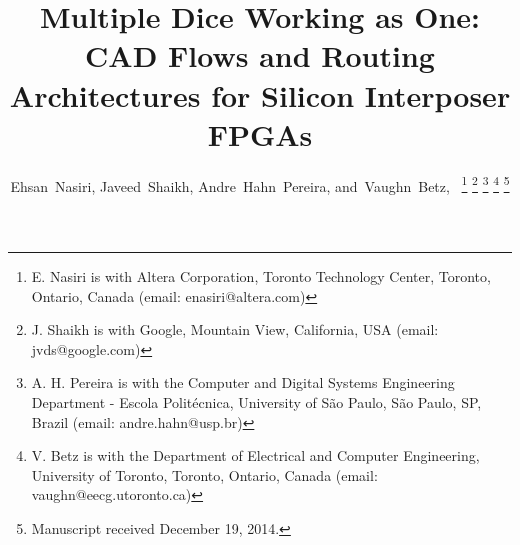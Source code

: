 \documentclass[journal]{IEEEtran}
\begin{document}
%
\title{Multiple Dice Working as One: CAD Flows and Routing Architectures for Silicon Interposer FPGAs}
%
%
%

\author{
		Ehsan~Nasiri,
		Javeed~Shaikh,
		Andre~Hahn~Pereira,
        and~Vaughn~Betz,~%
\thanks{E. Nasiri is with Altera Corporation, Toronto Technology Center, Toronto, Ontario, Canada (email: enasiri@altera.com)}%
\thanks{J. Shaikh is with Google, Mountain View, California, USA (email: jvds@google.com)}%
\thanks{A. H. Pereira is with the Computer and Digital Systems Engineering Department - Escola Polit\'{e}cnica, University of S\~{a}o Paulo, S\~{a}o Paulo, SP, Brazil (email: andre.hahn@usp.br)}%
\thanks{V. Betz is with the Department of Electrical and Computer Engineering, University of Toronto, Toronto, Ontario, Canada (email: vaughn@eecg.utoronto.ca)}%
\thanks{Manuscript received December 19, 2014.}}


\maketitle
\end{document}
